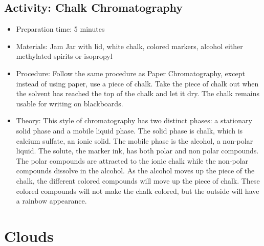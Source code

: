 \begin{itemize}
{\subsection{Activity: Chalk Chromatography}
\begin{itemize}
\item{Preparation time:  5 minutes}
\item{Materials: Jam Jar with lid, white chalk, colored markers, alcohol either methylated spirits or isopropyl}
\item{Procedure: Follow the same procedure as Paper Chromatography, except instead of using paper, use a piece of chalk. Take the piece of chalk out when the solvent has reached the top of the chalk and let it dry. The chalk remains usable for writing on blackboards.}
\item{Theory: This style of chromatography has two distinct phases: a stationary solid phase and a mobile liquid phase. The solid phase is chalk, which is calcium sulfate, an ionic solid. The mobile phase is the alcohol, a non-polar liquid. The solute, the marker ink, has both polar and non polar compounds. The polar compounds are attracted to the ionic chalk while the non-polar compounds dissolve in the alcohol. As the alcohol moves up the piece of the chalk, the different colored compounds will move up the piece of chalk. These colored compounds will not make the chalk colored, but the outside will have a rainbow appearance.}
\end{itemize}

\section{Clouds}

}
\end{itemize}
